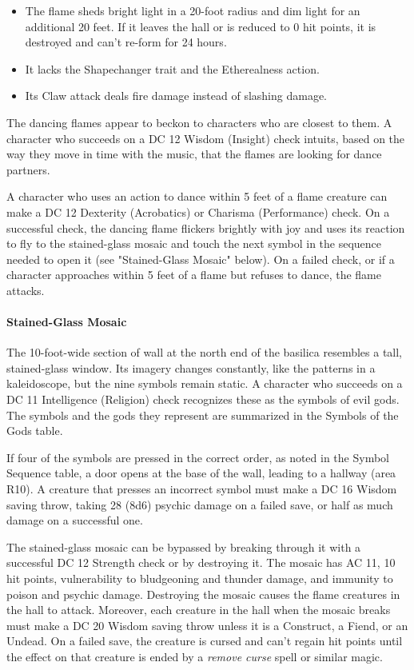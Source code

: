 \documentclass[letterpaper, 11pt, bg=full, twocolumn]{dndbook}
\begin{document}
\begin{itemize}
\item The flame sheds bright light in a 20-foot radius and dim light for an additional 20 feet. If it leaves the hall or is reduced to 0 hit points, it is destroyed and can't re-form for 24 hours.
\item It lacks the Shapechanger trait and the Etherealness action.
\item Its Claw attack deals fire damage instead of slashing damage.
\end{itemize}

The dancing flames appear to beckon to characters who are closest to them. A character who succeeds on a DC 12 Wisdom (Insight) check intuits, based on the way they move in time with the music, that the flames are looking for dance partners.

A character who uses an action to dance within 5 feet of a flame creature can make a DC 12 Dexterity (Acrobatics) or Charisma (Performance) check. On a successful check, the dancing flame flickers brightly with joy and uses its reaction to fly to the stained-glass mosaic and touch the next symbol in the sequence needed to open it (see "Stained-Glass Mosaic" below). On a failed check, or if a character approaches within 5 feet of a flame but refuses to dance, the flame attacks.

\paragraph{Stained-Glass Mosaic}

The 10-foot-wide section of wall at the north end of the basilica resembles a tall, stained-glass window. Its imagery changes constantly, like the patterns in a kaleidoscope, but the nine symbols remain static. A character who succeeds on a DC 11 Intelligence (Religion) check recognizes these as the symbols of evil gods. The symbols and the gods they represent are summarized in the Symbols of the Gods table.

If four of the symbols are pressed in the correct order, as noted in the Symbol Sequence table, a door opens at the base of the wall, leading to a hallway (area R10). A creature that presses an incorrect symbol must make a DC 16 Wisdom saving throw, taking 28 (8d6) psychic damage on a failed save, or half as much damage on a successful one.

The stained-glass mosaic can be bypassed by breaking through it with a successful DC 12 Strength check or by destroying it. The mosaic has AC 11, 10 hit points, vulnerability to bludgeoning and thunder damage, and immunity to poison and psychic damage. Destroying the mosaic causes the flame creatures in the hall to attack. Moreover, each creature in the hall when the mosaic breaks must make a DC 20 Wisdom saving throw unless it is a Construct, a Fiend, or an Undead. On a failed save, the creature is cursed and can't regain hit points until the effect on that creature is ended by a \textit{remove curse} spell or similar magic.
\end{document}
